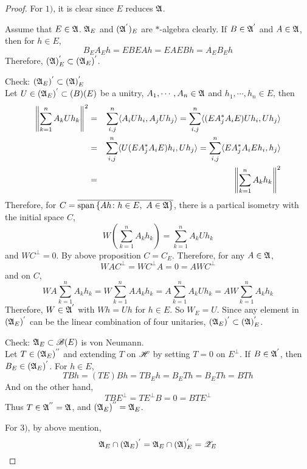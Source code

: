 \begin{proof}
	For $1)$, it is clear since $E$ reduces $\mathfrak{A}$. 
	\item Assume that $E \in \mathfrak{A}$. $\mathfrak{A}_E$ and $(\mathfrak{A}^{'})_E$ are $*$-algebra clearly. If $B \in \mathfrak{A}^{'}$ and $A \in \mathfrak{A}$, then for $h \in E$, 
	\begin{equation*}
		B_E A_E h = EBEAh = EAEBh = A_E B_E h
	\end{equation*}
	Therefore, $(\mathfrak{A})^{'}_E \subset (\mathfrak{A}_E)^{'}$.
	\item Check: $(\mathfrak{A}_E)^{'} \subset (\mathfrak{A})^{'}_E$ \\
	Let $U \in (\mathfrak{A}_E)^{'} \subset \mathscr{(}B)(E)$ be a unitry, $A_1,\cdots,A_n \in \mathfrak{A}$ and $h_1,\cdots,h_n \in E$, then
	\begin{eqnarray*}
		\left\lVert\sum_{k=1}^n A_k U h_k\right\lVert^2 &=& \sum_{i,j}^n \langle A_iUh_i,A_jUh_j \rangle = \sum_{i,j}^n \langle (EA_j^{*}A_iE)Uh_i, Uh_j \rangle \\
		&=& \sum_{i,j}^n \langle U(EA_j^{*}A_iE)h_i, Uh_j \rangle = \sum_{i,j}^n \langle EA_j^{*}A_iEh_i, h_j \rangle \\
		&=& \left\lVert\sum_{k=1}^n A_k h_k\right\lVert^2
	\end{eqnarray*}
	Therefore, for $C = \overline{\operatorname{span}{\{Ah \colon h \in E,~ A \in \mathfrak{A}\}}}$, there is a partical isometry with the initial space $C$,
	\begin{equation*}
		W(\sum_{k=1}^n A_k h_k) = \sum_{k=1}^n A_k U h_k
	\end{equation*}
	and $WC^{\bot} = 0$. By above proposition $C = C_E$. Therefore, for any $A \in \mathfrak{A}$,
	\begin{equation*}
		WAC^{\bot} = WC^{\bot}A = 0 = AWC^{\bot}
	\end{equation*}
	and on $C$,
	\begin{equation*}
		WA \sum_{k=1}^n A_k h_k = W \sum_{k=1}^n A A_k h_k = A \sum_{k=1}^n A_kUh_k = AW\sum_{k=1}^n A_k h_k
	\end{equation*}
	Therefore, $W \in \mathfrak{A}^{'}$ with $Wh = Uh$ for $h \in E$. So $W_E = U$. Since any element in $(\mathfrak{A}_E)^{'}$ can be the linear combination of four unitaries, $(\mathfrak{A}_E)^{'} \subset (\mathfrak{A})^{'}_E$.
	\item Check: $\mathfrak{A}_E \subset \mathscr{B}(E)$ is von Neumann. \\
	Let $T \in (\mathfrak{A}_E)^{''}$ and extending $T$ on $\mathscr{H}$ by setting $T = 0$ on $E^{\bot}$. If $B \in \mathfrak{A}^{'}$, then $B_E \in (\mathfrak{A}_E)^{'}$. For $h \in E$,
	\begin{equation*}
		TBh = (TE)Bh = T B_E h = B_E Th = B_E Th =B Th
	\end{equation*}
	And on the other hand,
	\begin{equation*}
		TBE^{\bot} = TE^{\bot}B = 0 = BTE^{\bot}
	\end{equation*}
	Thus $T \in \mathfrak{A}^{''} = \mathfrak{A}$, and $(\mathfrak{A}_E)^{''} = \mathfrak{A}_E$.
	\item For $3)$, by above mention, 
	\begin{equation*}
		\mathfrak{A}_E \cap (\mathfrak{A}_E)^{'} = \mathfrak{A}_E \cap (\mathfrak{A})^{'}_E = \mathscr{Z}_E \qedhere
	\end{equation*}
\end{proof}

